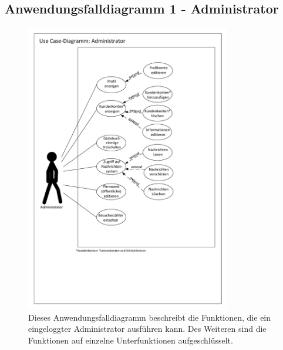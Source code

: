 \documentclass[10pt,a4paper]{scrartcl}
\begin{document}
\subsection{Anwendungsfalldiagramm 1 - Administrator}
\begin{figure}[!htbp]
\includegraphics[width=0.8\textwidth]{./Source/UseCaseAdministrator_11.pdf}
\caption{Dieses Anwendungsfalldiagramm beschreibt die Funktionen, die ein eingeloggter Administrator ausführen kann. Des Weiteren sind die Funktionen auf einzelne Unterfunktionen aufgeschlüsselt.}
\end{figure}
\newpage
\end{document}
